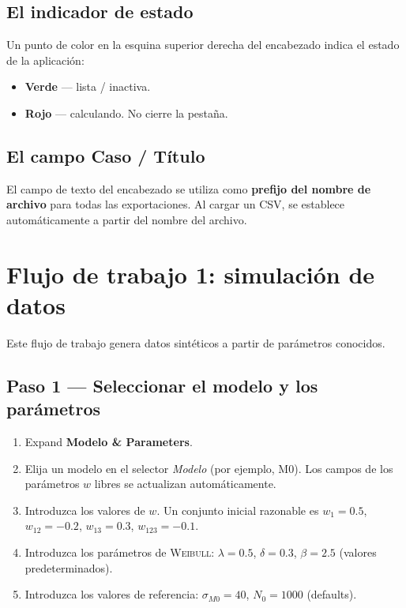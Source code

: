 \documentclass[11pt,a4paper]{article}
\newcommand{\sMzero}{\ensuremath{\sigma_{M0}}}
\newcommand{\Nzero}{\ensuremath{N_0}}
\newcommand{\Weibull}{\textsc{Weibull}}
\begin{document}
\subsection{El indicador de estado}

Un punto de color en la esquina superior derecha del encabezado indica el estado de la aplicación:
\begin{itemize}[leftmargin=1.4em]
  \item \textcolor{greenhl}{\textbf{Verde}} --- lista / inactiva.
  \item \textcolor{redhl}{\textbf{Rojo}} --- calculando. No cierre la pestaña.
\end{itemize}

\subsection{El campo Caso / Título}

El campo de texto del encabezado se utiliza como \textbf{prefijo del nombre de archivo} para todas las exportaciones. Al cargar un CSV, se establece automáticamente a partir del nombre del archivo.

\section{Flujo de trabajo 1: simulación de datos}

Este flujo de trabajo genera datos sintéticos a partir de parámetros conocidos.

\subsection{Paso 1 --- Seleccionar el modelo y los parámetros}

\begin{enumerate}[leftmargin=1.4em]
  \item Expand \textbf{Modelo \& Parameters}.
  \item Elija un modelo en el selector \textit{Modelo} (por ejemplo, M0). Los campos de los parámetros $w$ libres se actualizan automáticamente.
  \item Introduzca los valores de $w$. Un conjunto inicial razonable es $w_1=0.5$, $w_{12}=-0.2$, $w_{13}=0.3$, $w_{123}=-0.1$.
  \item Introduzca los parámetros de \Weibull{}: $\lambda=0.5$, $\delta=0.3$, $\beta=2.5$ (valores predeterminados).
  \item Introduzca los valores de referencia: $\sMzero=40$, $\Nzero=1000$ (defaults).
\end{enumerate}
\end{document}

